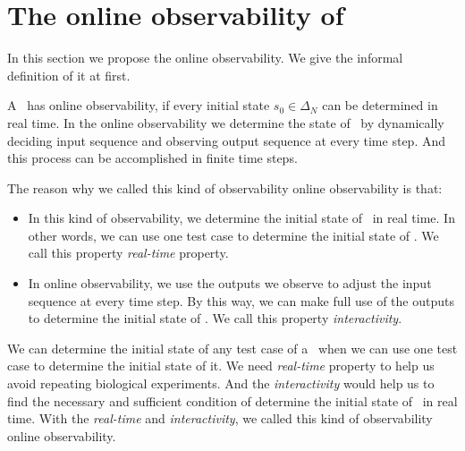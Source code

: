 \section{The online observability of \BCNs}
\label{sec:online}
In this section we propose the online observability. We give the informal definition of it at first. 

	A \BCN\ has online observability, if every initial state $s_0 \in \Delta_N$ can be determined in real time. In the online observability we determine the state of \BCN\ by dynamically deciding input sequence and observing output sequence at every time step. And this process can be accomplished in finite time steps.

The reason why we called this kind of observability online observability is that:
\begin{itemize}
  \item In this kind of observability, we determine the initial state of \BCNs\ in real time. In other words, we can use one test case to determine the initial state of \BCNs. We call this property {\em real-time} property.%
  \item In online observability, we use the outputs we observe to adjust the input sequence at every time step. By this way, we can make full use of the outputs to determine the initial state of \BCNs. We call this property {\em interactivity}.
\end{itemize} 

We can determine the initial state of any test case of a \BCN\ when we can use one test case to determine the initial state of it. We need {\em real-time} property to help us avoid repeating biological experiments. And the {\em interactivity} would help us to find the necessary and sufficient condition of determine the initial state of \BCNs\ in real time. With the  {\em real-time} and {\em interactivity}, we called this kind of observability online observability.

